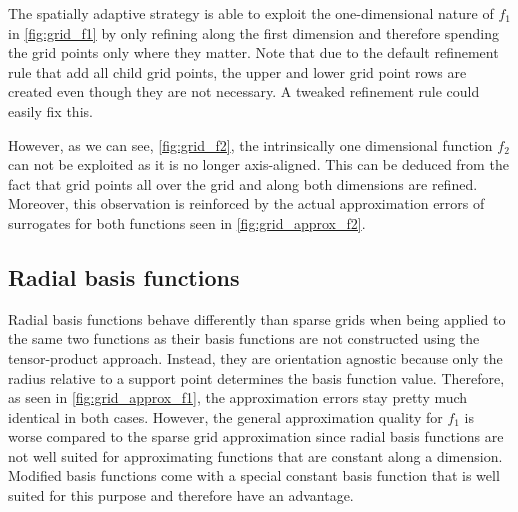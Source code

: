 \documentclass[
  a4paper,  %
  twoside,  %
  bibliography=totoc,
  headsepline,
  cleardoublepage=empty,
  parskip=half,
  draft=false
]{scrbook}
\begin{document}
The spatially adaptive strategy is able to exploit the one-dimensional nature of $f_1$ in \cref{fig:grid_f1} by only refining along the first dimension and therefore spending the grid points only where they matter.
Note that due to the default refinement rule that add all child grid points, the upper and lower grid point rows are created even though they are not necessary.
A tweaked refinement rule could easily fix this.

However, as we can see, \cref{fig:grid_f2}, the intrinsically one dimensional function $f_2$ can not be exploited as it is no longer axis-aligned.
This can be deduced from the fact that grid points all over the grid and along both dimensions are refined.
Moreover, this observation is reinforced by the actual approximation errors of surrogates for both functions seen in \cref{fig:grid_approx_f2}.

\subsection{Radial basis functions}

Radial basis functions behave differently than sparse grids when being applied to the same two functions as their basis functions are not constructed using the tensor-product approach.
Instead, they are orientation agnostic because only the radius relative to a support point determines the basis function value.
Therefore, as seen in \cref{fig:grid_approx_f1}, the approximation errors stay pretty much identical in both cases.
However, the general approximation quality for $f_1$ is worse compared to the sparse grid approximation since radial basis functions are not well suited for approximating functions that are constant along a dimension.
Modified basis functions come with a special constant basis function that is well suited for this purpose and therefore have an advantage.
\end{document}
